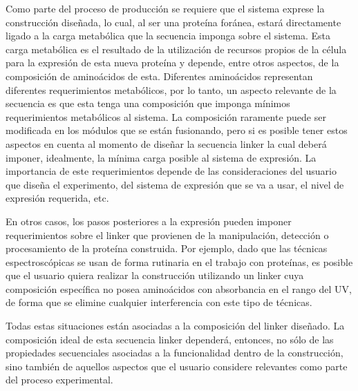 
Como parte del proceso de producción se requiere que el sistema exprese la construcción diseñada, lo cual, al ser una proteína foránea, estará directamente ligado a la carga
metabólica que la secuencia imponga sobre el sistema\cite{glick1995metabolic}. Esta carga metabólica es el resultado de la utilización de recursos propios de la célula para la expresión de esta nueva proteína y depende, entre otros aspectos, 
de la composición de aminoácidos de esta. 
Diferentes aminoácidos representan diferentes requerimientos metabólicos, por lo tanto, un aspecto relevante de la secuencia es que esta tenga una composición que imponga mínimos requerimientos metabólicos al sistema. 
La composición raramente puede ser modificada en los módulos que se están fusionando, pero si es posible tener estos aspectos en cuenta al momento de diseñar la secuencia linker la cual deberá imponer, idealmente, 
la mínima carga posible al sistema de expresión. La importancia de este requerimientos depende de las consideraciones del usuario que diseña el experimento, del sistema de expresión que se va a usar, el nivel de expresión requerida, etc.

En otros casos, los pasos posteriores a la expresión pueden imponer requerimientos sobre el linker que provienen de la manipulación, detección o procesamiento de la proteína construida.
Por ejemplo, dado que las técnicas espectroscópicas se usan de forma rutinaria en el trabajo con proteínas, es posible que el usuario 
quiera realizar la construcción utilizando un linker cuya composición específica no posea aminoácidos con absorbancia en el rango del UV, 
de forma que se elimine cualquier interferencia con este tipo de técnicas.

Todas estas situaciones están asociadas a la composición del linker diseñado. 
La composición ideal de esta secuencia linker dependerá, entonces, no sólo de las propiedades secuenciales asociadas a la funcionalidad dentro de la construcción, sino también de aquellos aspectos 
que el usuario considere relevantes como parte del proceso experimental.






